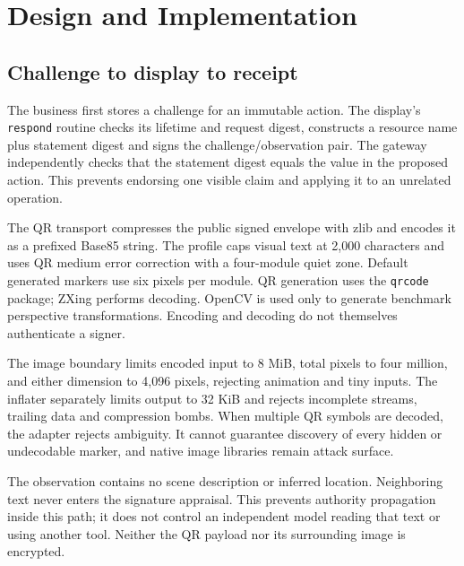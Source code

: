 \section{Design and Implementation}
\subsection{Challenge to display to receipt}
The business first stores a challenge for an immutable action. The display's
\texttt{respond} routine checks its lifetime and request digest, constructs a
resource name plus statement digest and signs the challenge/observation pair.
The gateway independently checks that the statement digest equals the value in
the proposed action. This prevents endorsing one visible claim and applying it
to an unrelated operation.

The QR transport compresses the public signed envelope with zlib and encodes it
as a prefixed Base85 string. The profile caps visual text at 2,000 characters and
uses QR medium error correction with a four-module quiet zone. Default generated
markers use six pixels per module. QR generation uses the \texttt{qrcode} package;
ZXing performs decoding. OpenCV is used only to generate benchmark perspective
transformations. Encoding and decoding do not themselves authenticate a signer.

The image boundary limits encoded input to 8 MiB, total pixels to four million,
and either dimension to 4,096 pixels, rejecting animation and tiny inputs. The
inflater separately limits output to 32 KiB and rejects incomplete streams,
trailing data and compression bombs. When multiple QR symbols are decoded, the
adapter rejects ambiguity. It cannot guarantee discovery of every hidden or
undecodable marker, and native image libraries remain attack surface.

The observation contains no scene description or inferred location. Neighboring
text never enters the signature appraisal. This prevents authority propagation
inside this path; it does not control an independent model reading that text or
using another tool. Neither the QR payload nor its surrounding image is encrypted.
